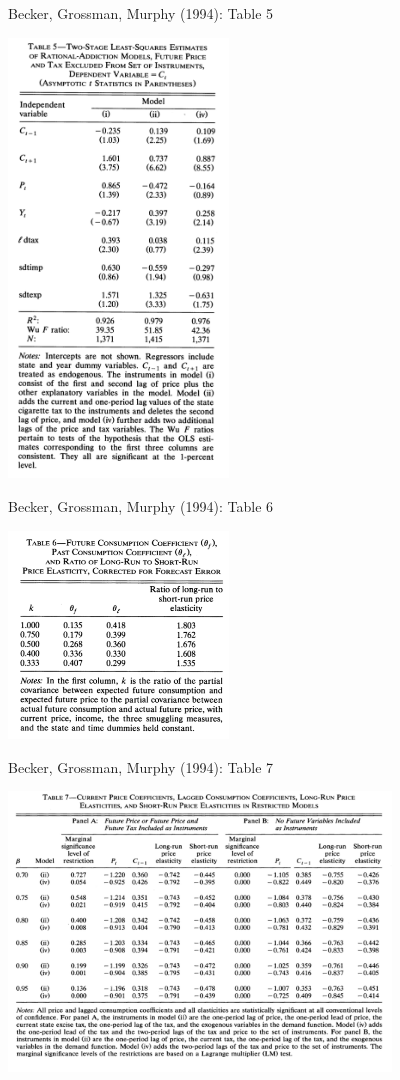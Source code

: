 \documentclass[xcolor=pdftex,dvipsnames,table,mathserif,aspectratio=169]{beamer}
\begin{document}
\begin{frame}{Becker, Grossman, Murphy (1994): Table 5}
\begin{center}
\includegraphics[width=2.3in]{./resources/gbm_t5.png}
\end{center}
\end{frame}

\begin{frame}{Becker, Grossman, Murphy (1994): Table 6}
\begin{center}
\includegraphics[width=2.3in]{./resources/gbm_t6.png}
\end{center}
\end{frame}

\begin{frame}{Becker, Grossman, Murphy (1994): Table 7}
\begin{center}
\includegraphics[width=4in]{./resources/gbm_t7.png}
\end{center}
\end{frame}
\end{document}
